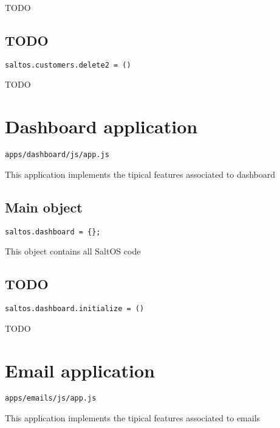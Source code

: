 \documentclass[a4paper]{book}
\begin{document}
TODO

\hypertarget{toc12}{}
\subsection{TODO}

\begin{lstlisting}
saltos.customers.delete2 = ()
\end{lstlisting}

TODO

\hypertarget{toc13}{}
\section{Dashboard application}

\begin{lstlisting}
apps/dashboard/js/app.js
\end{lstlisting}

This application implements the tipical features associated to dashboard

\hypertarget{toc14}{}
\subsection{Main object}

\begin{lstlisting}
saltos.dashboard = {};
\end{lstlisting}

This object contains all SaltOS code

\hypertarget{toc15}{}
\subsection{TODO}

\begin{lstlisting}
saltos.dashboard.initialize = ()
\end{lstlisting}

TODO

\hypertarget{toc16}{}
\section{Email application}

\begin{lstlisting}
apps/emails/js/app.js
\end{lstlisting}

This application implements the tipical features associated to emails

\hypertarget{toc17}{}
\end{document}
